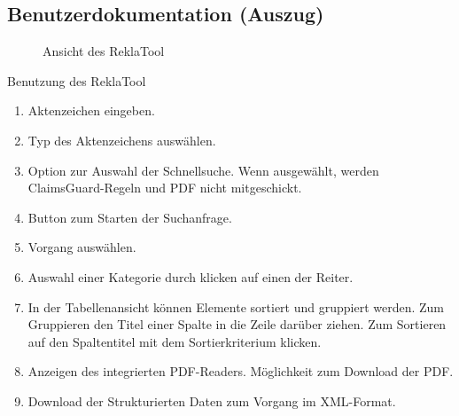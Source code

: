 \subsection{Benutzerdokumentation (Auszug)}
\label{app:BenutzerDoku}
\begin{figure}[htb]
    \centering
    \caption{Ansicht des ReklaTool}
\end{figure}

Benutzung des ReklaTool
\begin{enumerate}
    \item Aktenzeichen eingeben.
    \item Typ des Aktenzeichens auswählen.
    \item Option zur Auswahl der Schnellsuche. Wenn ausgewählt, werden ClaimsGuard-Regeln und PDF nicht mitgeschickt.
    \item Button zum Starten der Suchanfrage.
    \item Vorgang auswählen.
    \item Auswahl einer Kategorie durch klicken auf einen der Reiter.
    \item In der Tabellenansicht können Elemente sortiert und gruppiert werden. Zum Gruppieren den Titel einer Spalte in die 
    Zeile darüber ziehen. Zum Sortieren auf den Spaltentitel mit dem Sortierkriterium klicken.
    \item Anzeigen des integrierten PDF-Readers. Möglichkeit zum Download der PDF.
    \item Download der Strukturierten Daten zum Vorgang im XML-Format.
\end{enumerate}